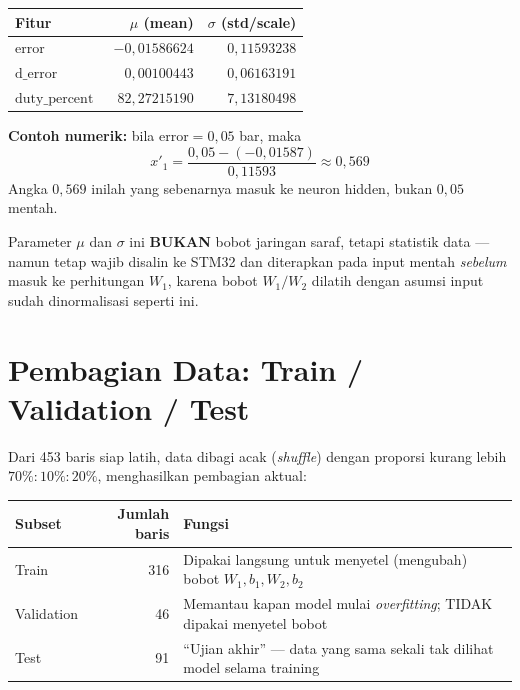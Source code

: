 \documentclass[11pt,a4paper]{article}
\begin{document}
\begin{center}
\begin{tabular}{@{}l r r@{}}
\toprule
\textbf{Fitur} & $\mu$ (mean) & $\sigma$ (std/scale) \\
\midrule
$\mathrm{error}$        & $-0{,}01586624$ & $0{,}11593238$ \\
$\mathrm{d\_error}$     & $\phantom{-}0{,}00100443$  & $0{,}06163191$ \\
$\mathrm{duty\_percent}$ & $82{,}27215190$ & $7{,}13180498$ \\
\bottomrule
\end{tabular}
\end{center}

\textbf{Contoh numerik:} bila $\mathrm{error} = 0{,}05$ bar, maka
\[
  x'_1 = \frac{0{,}05 - (-0{,}01587)}{0{,}11593} \approx 0{,}569
\]
Angka $0{,}569$ inilah yang sebenarnya masuk ke neuron hidden, bukan $0{,}05$ mentah.

\begin{notebox}
Parameter $\mu$ dan $\sigma$ ini \textbf{BUKAN} bobot jaringan saraf, tetapi statistik
data --- namun tetap wajib disalin ke STM32 dan diterapkan pada input mentah
\emph{sebelum} masuk ke perhitungan $W_1$, karena bobot $W_1/W_2$ dilatih dengan asumsi
input sudah dinormalisasi seperti ini.
\end{notebox}

\section{Pembagian Data: Train / Validation / Test}
\label{sec:split}

Dari 453 baris siap latih, data dibagi acak (\emph{shuffle}) dengan proporsi kurang lebih
$70\% : 10\% : 20\%$, menghasilkan pembagian aktual:

\begin{center}
\begin{tabular}{@{}l r p{7.4cm}@{}}
\toprule
\textbf{Subset} & \textbf{Jumlah baris} & \textbf{Fungsi} \\
\midrule
Train      & 316 & Dipakai langsung untuk menyetel (mengubah) bobot $W_1,b_1,W_2,b_2$ \\
Validation & 46  & Memantau kapan model mulai \emph{overfitting}; TIDAK dipakai menyetel bobot \\
Test       & 91  & ``Ujian akhir'' --- data yang sama sekali tak dilihat model selama training \\
\bottomrule
\end{tabular}
\end{center}
\end{document}
